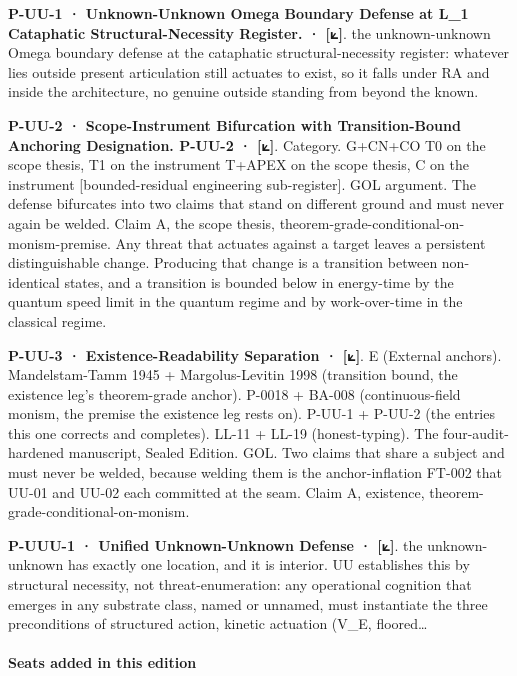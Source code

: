 \documentclass[10pt,twocolumn]{article}
\begin{document}
\textbf{P-UU-1 · Unknown-Unknown Omega Boundary Defense at L\_1
Cataphatic Structural-Necessity Register. · {[}⟀{]}}. the
unknown-unknown Omega boundary defense at the cataphatic
structural-necessity register: whatever lies outside present
articulation still actuates to exist, so it falls under RA and inside
the architecture, no genuine outside standing from beyond the known.

\textbf{P-UU-2 · Scope-Instrument Bifurcation with Transition-Bound
Anchoring Designation. P-UU-2 · {[}⟀{]}}. Category. G+CN+CO \textbar{}
T0 on the scope thesis, T1 on the instrument \textbar{} T+APEX on the
scope thesis, C on the instrument {[}bounded-residual engineering
sub-register{]}. GOL argument. The defense bifurcates into two claims
that stand on different ground and must never again be welded. Claim A,
the scope thesis, theorem-grade-conditional-on-monism-premise. Any
threat that actuates against a target leaves a persistent
distinguishable change. Producing that change is a transition between
non-identical states, and a transition is bounded below in energy-time
by the quantum speed limit in the quantum regime and by work-over-time
in the classical regime.

\textbf{P-UU-3 · Existence-Readability Separation · {[}⟀{]}}. E
(External anchors). Mandelstam-Tamm 1945 + Margolus-Levitin 1998
(transition bound, the existence leg's theorem-grade anchor). P-0018 +
BA-008 (continuous-field monism, the premise the existence leg rests
on). P-UU-1 + P-UU-2 (the entries this one corrects and completes).
LL-11 + LL-19 (honest-typing). The four-audit-hardened manuscript,
Sealed Edition. GOL. Two claims that share a subject and must never be
welded, because welding them is the anchor-inflation FT-002 that UU-01
and UU-02 each committed at the seam. Claim A, existence,
theorem-grade-conditional-on-monism.

\textbf{P-UUU-1 · Unified Unknown-Unknown Defense · {[}⟀{]}}. the
unknown-unknown has exactly one location, and it is interior. UU
establishes this by structural necessity, not threat-enumeration: any
operational cognition that emerges in any substrate class, named or
unnamed, must instantiate the three preconditions of structured action,
kinetic actuation (V\_E, floored\ldots{}

\hypertarget{seats-added-in-this-edition-5}{%
\paragraph{Seats added in this
edition}\label{seats-added-in-this-edition-5}}
\end{document}
